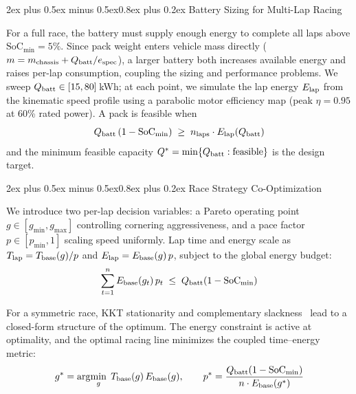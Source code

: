 \documentclass[conf]{new-aiaa}
\makeatletter
\renewcommand\section{\@startsection{section}{1}{\z@}%
  {2ex plus 0.5ex minus 0.5ex}{0.8ex plus 0.2ex}%
  {\normalfont\large\bfseries\centering}}
\makeatother
\begin{document}
\section{Battery Sizing for Multi-Lap Racing}\label{sec:sizing}

For a full race, the battery must supply enough energy to complete all laps above
$\mathrm{SoC}_{\min} = 5\%$. Since pack weight enters vehicle mass directly ($m = m_{\rm chassis} + Q_{\rm batt} / e_{\rm spec}$), a larger battery both increases available energy and raises per-lap consumption, coupling the sizing and performance problems.
We sweep $Q_{\rm batt} \in [15, 80]$\,kWh; at each point, we simulate the lap energy $E_{\rm lap}$ from the kinematic speed profile
using a parabolic motor efficiency map (peak $\eta = 0.95$ at 60\% rated power). A pack is feasible when
\begin{equation}\label{eq:feasibility}
  Q_{\rm batt}\,(1 - \mathrm{SoC}_{\min}) \;\geq\; n_{\rm laps} \cdot E_{\rm lap}(Q_{\rm batt})
\end{equation}
and the minimum feasible capacity $Q^* = \min\{Q_{\rm batt} : \text{feasible}\}$ is the design target.

\section{Race Strategy Co-Optimization}\label{sec:strategy}

We introduce two per-lap decision variables: a Pareto operating point $g \in [g_{\min},
g_{\max}]$ controlling cornering aggressiveness, and a pace factor $p \in [p_{\min}, 1]$ scaling
speed uniformly. Lap time and energy scale as $T_{\rm lap} = T_{\rm base}(g)/p$ and
$E_{\rm lap} = E_{\rm base}(g)\,p$, subject to the global energy budget:
\begin{equation}\label{eq:energy_constraint}
  \sum_{t=1}^{n} E_{\rm base}(g_t)\,p_t \;\leq\; Q_{\rm batt}(1 - \mathrm{SoC}_{\min})
\end{equation}

For a symmetric race, KKT stationarity and complementary slackness~\cite{Kochenderfer2019}
lead to a closed-form structure of the optimum. The energy constraint is active at optimality, and
the optimal racing line minimizes the coupled time--energy metric:
\begin{equation}\label{eq:kkt}
  g^* = \arg\!\min_{g}\; T_{\rm base}(g)\,E_{\rm base}(g),
  \qquad
  p^* = \frac{Q_{\rm batt}(1-\mathrm{SoC}_{\min})}{n \cdot E_{\rm base}(g^*)}
\end{equation}
\end{document}

